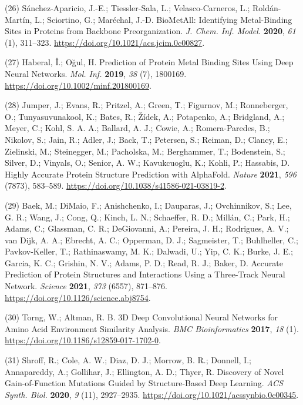 \documentclass[ lineno,
  9pt]{elife}
\newenvironment{cslreferences}%
  {}%
  {\par}
\begin{document}
\begin{cslreferences}
\leavevmode\hypertarget{ref-iHxzzTCG}{}%
(26) Sánchez-Aparicio, J.-E.; Tiessler-Sala, L.; Velasco-Carneros, L.; Roldán-Martín, L.; Sciortino, G.; Maréchal, J.-D. BioMetAll: Identifying Metal-Binding Sites in Proteins from Backbone Preorganization. \emph{J. Chem. Inf. Model.} \textbf{2020}, \emph{61} (1), 311--323. \url{https://doi.org/10.1021/acs.jcim.0c00827}.

\leavevmode\hypertarget{ref-13sNVOrHB}{}%
(27) Haberal, İ.; Oğul, H. Prediction of Protein Metal Binding Sites Using Deep Neural Networks. \emph{Mol. Inf.} \textbf{2019}, \emph{38} (7), 1800169. \url{https://doi.org/10.1002/minf.201800169}.

\leavevmode\hypertarget{ref-yZfcMIwh}{}%
(28) Jumper, J.; Evans, R.; Pritzel, A.; Green, T.; Figurnov, M.; Ronneberger, O.; Tunyasuvunakool, K.; Bates, R.; Žídek, A.; Potapenko, A.; Bridgland, A.; Meyer, C.; Kohl, S. A. A.; Ballard, A. J.; Cowie, A.; Romera-Paredes, B.; Nikolov, S.; Jain, R.; Adler, J.; Back, T.; Petersen, S.; Reiman, D.; Clancy, E.; Zielinski, M.; Steinegger, M.; Pacholska, M.; Berghammer, T.; Bodenstein, S.; Silver, D.; Vinyals, O.; Senior, A. W.; Kavukcuoglu, K.; Kohli, P.; Hassabis, D. Highly Accurate Protein Structure Prediction with AlphaFold. \emph{Nature} \textbf{2021}, \emph{596} (7873), 583--589. \url{https://doi.org/10.1038/s41586-021-03819-2}.

\leavevmode\hypertarget{ref-rnu2o8C9}{}%
(29) Baek, M.; DiMaio, F.; Anishchenko, I.; Dauparas, J.; Ovchinnikov, S.; Lee, G. R.; Wang, J.; Cong, Q.; Kinch, L. N.; Schaeffer, R. D.; Millán, C.; Park, H.; Adams, C.; Glassman, C. R.; DeGiovanni, A.; Pereira, J. H.; Rodrigues, A. V.; van Dijk, A. A.; Ebrecht, A. C.; Opperman, D. J.; Sagmeister, T.; Buhlheller, C.; Pavkov-Keller, T.; Rathinaswamy, M. K.; Dalwadi, U.; Yip, C. K.; Burke, J. E.; Garcia, K. C.; Grishin, N. V.; Adams, P. D.; Read, R. J.; Baker, D. Accurate Prediction of Protein Structures and Interactions Using a Three-Track Neural Network. \emph{Science} \textbf{2021}, \emph{373} (6557), 871--876. \url{https://doi.org/10.1126/science.abj8754}.

\leavevmode\hypertarget{ref-ls5kyxZ3}{}%
(30) Torng, W.; Altman, R. B. 3D Deep Convolutional Neural Networks for Amino Acid Environment Similarity Analysis. \emph{BMC Bioinformatics} \textbf{2017}, \emph{18} (1). \url{https://doi.org/10.1186/s12859-017-1702-0}.

\leavevmode\hypertarget{ref-F7P74Etp}{}%
(31) Shroff, R.; Cole, A. W.; Diaz, D. J.; Morrow, B. R.; Donnell, I.; Annapareddy, A.; Gollihar, J.; Ellington, A. D.; Thyer, R. Discovery of Novel Gain-of-Function Mutations Guided by Structure-Based Deep Learning. \emph{ACS Synth. Biol.} \textbf{2020}, \emph{9} (11), 2927--2935. \url{https://doi.org/10.1021/acssynbio.0c00345}.


\end{cslreferences}
\end{document}
